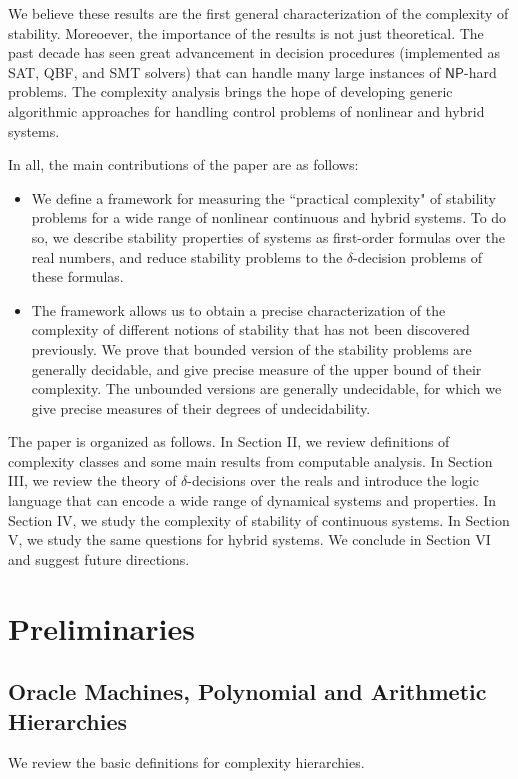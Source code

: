 \documentclass[10pt]{article}
\theoremstyle{plain}
\theoremstyle{definition}
\newcommand{\np}{\mathsf{NP}}
\begin{document}
We believe these results are the first general characterization of the complexity of stability. Moreoever, the importance of the results is not just theoretical. The past decade has seen great advancement in decision procedures (implemented as SAT, QBF, and SMT solvers) that can handle many large instances of $\np$-hard problems. The complexity analysis brings the hope of developing generic algorithmic approaches for handling control problems of nonlinear and hybrid systems.

In all, the main contributions of the paper are as follows:
\begin{itemize}
\item We define a framework for measuring the ``practical complexity" of stability problems for a wide range of nonlinear continuous and hybrid systems. To do so, we describe stability properties of systems as first-order formulas over the real numbers, and reduce stability problems to the $\delta$-decision problems of these formulas. 
\item The framework allows us to obtain a precise characterization of the complexity of different notions of stability that has not been discovered previously. We prove that bounded version of the stability problems are generally decidable, and give precise measure of the upper bound of their complexity. The unbounded versions are generally undecidable, for which we give precise measures of their degrees of undecidability. 
\end{itemize}
The paper is organized as follows. In Section II, we review definitions of complexity classes and some main results from computable analysis. In Section III, we review the theory of $\delta$-decisions over the reals and introduce the logic language that can encode a wide range of dynamical systems and properties. In Section IV, we study the complexity of stability of continuous systems. In Section V, we study the same questions for hybrid systems. We conclude in Section VI and suggest future directions. 

\section{Preliminaries}
\subsection{Oracle Machines, Polynomial and Arithmetic Hierarchies}

We review the basic definitions for complexity hierarchies. 
\end{document}
